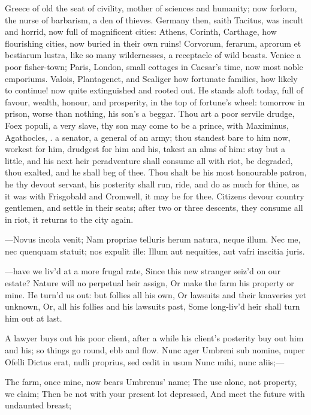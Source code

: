 {Greece of old the seat of civility, mother of sciences and humanity;
now forlorn, the nurse of barbarism, a den of thieves. Germany then,
saith Tacitus, was incult and horrid, now full of magnificent cities:
Athens, Corinth, Carthage, how flourishing cities, now buried in their
own ruins! Corvorum, ferarum, aprorum et bestiarum lustra, like so many
wildernesses, a receptacle of wild beasts. Venice a poor fisher-town;
Paris, London, small cottages in Caesar's time, now most noble
emporiums. Valois, Plantagenet, and Scaliger how fortunate families,
how likely to continue! now quite extinguished and rooted out. He
stands aloft today, full of favour, wealth, honour, and prosperity, in
the top of fortune's wheel: tomorrow in prison, worse than nothing, his
son's a beggar. Thou art a poor servile drudge, Foex populi, a very
slave, thy son may come to be a prince, with Maximinus, Agathocles, \etc{}.
a senator, a general of an army; thou standest bare to him now, workest
for him, drudgest for him and his, takest an alms of him: stay but a
little, and his next heir peradventure shall consume all with riot, be
degraded, thou exalted, and he shall beg of thee. Thou shalt be his
most honourable patron, he thy devout servant, his posterity shall run,
ride, and do as much for thine, as it was with Frisgobald and
Cromwell, it may be for thee. Citizens devour country gentlemen, and
settle in their seats; after two or three descents, they consume all in
riot, it returns to the city again.

---Novus incola venit;
Nam propriae telluris herum natura, neque illum.
Nec me, nec quenquam statuit; nos expulit ille:
Illum aut nequities, aut vafri inscitia juris.

---have we liv'd at a more frugal rate,
Since this new stranger seiz'd on our estate?
Nature will no perpetual heir assign,
Or make the farm his property or mine.
He turn'd us out: but follies all his own,
Or lawsuits and their knaveries yet unknown,
Or, all his follies and his lawsuits past,
Some long-liv'd heir shall turn him out at last.

A lawyer buys out his poor client, after a while his client's posterity
buy out him and his; so things go round, ebb and flow.
Nunc ager Umbreni sub nomine, nuper Ofelli
Dictus erat, nulli proprius, sed cedit in usum
Nunc mihi, nunc aliis;---

The farm, once mine, now bears Umbrenus' name;
The use alone, not property, we claim;
Then be not with your present lot depressed,
And meet the future with undaunted breast;

}

